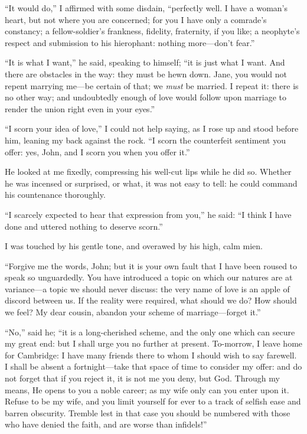 \enquote{It would do,} I affirmed with some disdain, \enquote{perfectly
well. I have a woman's heart, but not where you are concerned; for you
I have only a comrade's constancy; a fellow-soldier's frankness,
fidelity, fraternity, if you like; a neophyte's respect and submission
to his hierophant: nothing more---don't fear.}

\enquote{It is what I want,} he said, speaking to himself; \enquote{it is just
what I want. And there are obstacles in the way: they must be hewn
down. Jane, you would not repent marrying me---be certain of that; we
\emph{must} be married. I repeat it: there is no other way; and
undoubtedly enough of love would follow upon marriage to render the
union right even in your eyes.}

\enquote{I scorn your idea of love,} I could not help saying, as I rose
up and stood before him, leaning my back against the rock. \enquote{I
scorn the counterfeit sentiment you offer: yes, \St{} John, and I scorn
you when you offer it.}

He looked at me fixedly, compressing his well-cut lips while he did so. 
Whether he was incensed or surprised, or what, it was not easy to tell:
he could command his countenance thoroughly.

\enquote{I scarcely expected to hear that expression from you,} he said:
\enquote{I think I have done and uttered nothing to deserve scorn.}

I was touched by his gentle tone, and overawed by his high, calm mien.

\enquote{Forgive me the words, \St{} John; but it is your own fault that I
have been roused to speak so unguardedly. You have introduced a topic
on which our natures are at variance---a topic we should never discuss:
the very name of love is an apple of discord between us. If the reality
were required, what should we do? How should we feel? My dear cousin,
abandon your scheme of marriage---forget it.}

\enquote{No,} said he; \enquote{it is a long-cherished scheme, and the
only one which can secure my great end: but I shall urge you no further
at present. To-morrow, I leave home for Cambridge: I have many friends
there to whom I should wish to say farewell. I shall be absent a
fortnight---take that space of time to consider my offer: and do not
forget that if you reject it, it is not me you deny, but God. Through
my means, He opens to you a noble career; as my wife only can you enter
upon it. Refuse to be my wife, and you limit yourself for ever to a
track of selfish ease and barren obscurity. Tremble lest in that case
you should be numbered with those who have denied the faith, and are
worse than infidels!}

